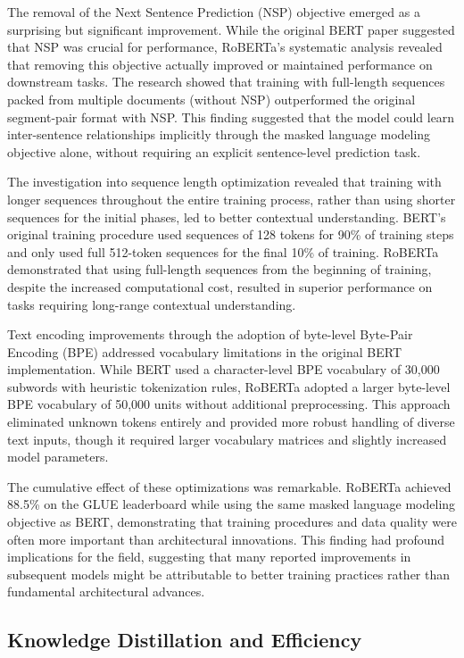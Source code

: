 \documentclass[
  titlepage]{article}
\begin{document}
The removal of the Next Sentence Prediction (NSP) objective emerged as a
surprising but significant improvement. While the original BERT paper
suggested that NSP was crucial for performance, RoBERTa's systematic
analysis revealed that removing this objective actually improved or
maintained performance on downstream tasks. The research showed that
training with full-length sequences packed from multiple documents
(without NSP) outperformed the original segment-pair format with NSP.
This finding suggested that the model could learn inter-sentence
relationships implicitly through the masked language modeling objective
alone, without requiring an explicit sentence-level prediction task.

The investigation into sequence length optimization revealed that
training with longer sequences throughout the entire training process,
rather than using shorter sequences for the initial phases, led to
better contextual understanding. BERT's original training procedure used
sequences of 128 tokens for 90\% of training steps and only used full
512-token sequences for the final 10\% of training. RoBERTa demonstrated
that using full-length sequences from the beginning of training, despite
the increased computational cost, resulted in superior performance on
tasks requiring long-range contextual understanding.

Text encoding improvements through the adoption of byte-level Byte-Pair
Encoding (BPE) addressed vocabulary limitations in the original BERT
implementation. While BERT used a character-level BPE vocabulary of
30,000 subwords with heuristic tokenization rules, RoBERTa adopted a
larger byte-level BPE vocabulary of 50,000 units without additional
preprocessing. This approach eliminated unknown tokens entirely and
provided more robust handling of diverse text inputs, though it required
larger vocabulary matrices and slightly increased model parameters.

The cumulative effect of these optimizations was remarkable. RoBERTa
achieved 88.5\% on the GLUE leaderboard while using the same masked
language modeling objective as BERT, demonstrating that training
procedures and data quality were often more important than architectural
innovations. This finding had profound implications for the field,
suggesting that many reported improvements in subsequent models might be
attributable to better training practices rather than fundamental
architectural advances.

\subsection{Knowledge Distillation and
Efficiency}\label{knowledge-distillation-and-efficiency}
\end{document}

